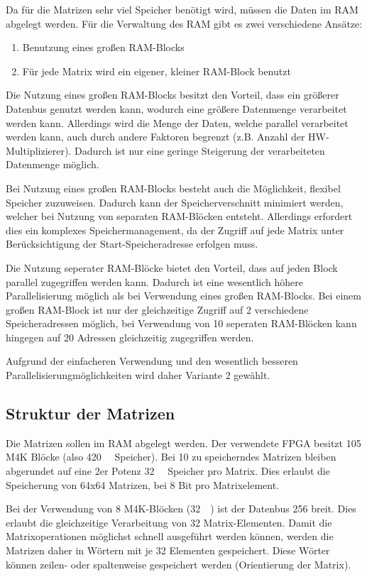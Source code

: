 \documentclass
[ 12pt,
  parskip=half %
]{scrreprt}
\begin{document}
Da für die Matrizen sehr viel Speicher benötigt wird, müssen die Daten im RAM abgelegt werden. Für die Verwaltung des RAM gibt es zwei verschiedene Ansätze:
\begin{enumerate}
	\item Benutzung eines großen RAM-Blocks
	\item Für jede Matrix wird ein eigener, kleiner RAM-Block benutzt
\end{enumerate}

Die Nutzung eines großen RAM-Blocks besitzt den Vorteil, dass ein größerer Datenbus genutzt werden kann, wodurch eine größere Datenmenge verarbeitet werden kann. Allerdings wird die Menge der Daten, welche parallel verarbeitet werden kann, auch durch andere Faktoren begrenzt (z.B. Anzahl der HW-Multiplizierer). Dadurch ist nur eine geringe Steigerung der verarbeiteten Datenmenge möglich.

Bei Nutzung eines großen RAM-Blocks besteht auch die  Möglichkeit, flexibel Speicher zuzuweisen. Dadurch kann der Speicherverschnitt minimiert werden, welcher bei Nutzung von separaten RAM-Blöcken entsteht. Allerdings erfordert dies ein komplexes Speichermanagement, da der Zugriff auf jede Matrix unter Berücksichtigung der Start-Speicheradresse erfolgen muss. 

Die Nutzung seperater RAM-Blöcke bietet den Vorteil, dass auf jeden Block parallel zugegriffen werden kann. Dadurch ist eine wesentlich höhere Parallelisierung möglich als bei Verwendung eines großen RAM-Blocks. Bei einem großen RAM-Block ist nur der gleichzeitige Zugriff auf 2 verschiedene Speicheradressen möglich, bei Verwendung von 10 seperaten RAM-Blöcken kann hingegen auf 20 Adressen gleichzeitig zugegriffen werden. 
 
Aufgrund der einfacheren Verwendung und den wesentlich besseren Parallelisierungmöglichkeiten wird daher Variante 2 gewählt.

\subsection{Struktur der Matrizen}

Die Matrizen sollen im RAM abgelegt werden. Der verwendete FPGA besitzt 105 M4K Blöcke (also \SI{420}{\kilo\byte} Speicher). Bei 10 zu speicherndes Matrizen bleiben abgerundet auf eine 2er Potenz \SI{32}{\kilo\byte} Speicher pro Matrix. Dies erlaubt die Speicherung von 64x64 Matrizen, bei 8 Bit pro Matrixelement. 

Bei der Verwendung von 8 M4K-Blöcken (\SI{32}{\kilo\byte}) ist der Datenbus \SI{256}{\bit} breit. Dies erlaubt die gleichzeitige Verarbeitung von 32 Matrix-Elementen. Damit die Matrixoperationen möglichst schnell ausgeführt werden können, werden die Matrizen daher in Wörtern mit je 32 Elementen gespeichert. Diese Wörter können zeilen- oder spaltenweise gespeichert werden (Orientierung der Matrix). 
\end{document}
